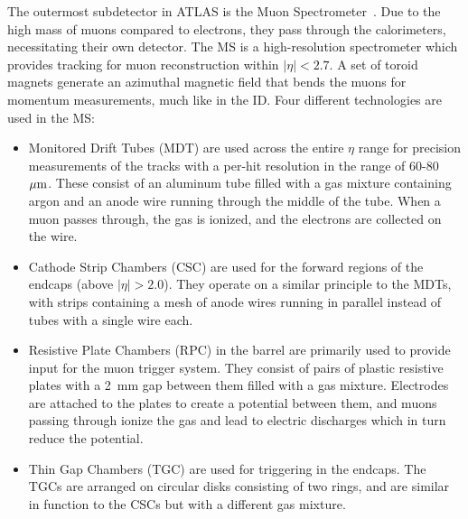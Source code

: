The outermost subdetector in ATLAS is the Muon Spectrometer~\cite{1997.ms-tdr}.
Due to the high mass of muons compared to electrons, they pass through the calorimeters, necessitating their own detector.
The MS is a high-resolution spectrometer which provides tracking for muon reconstruction within $|\eta| < 2.7$.
A set of toroid magnets generate an azimuthal magnetic field that bends the muons for momentum measurements, much like in the ID.
Four different technologies are used in the MS:
\begin{itemize}
\item Monitored Drift Tubes (MDT) are used across the entire $\eta$ range for precision measurements of the tracks with a per-hit resolution in the range of 60-80~$\mu\textrm{m}$.
These consist of an aluminum tube filled with a gas mixture containing argon and an anode wire running through the middle of the tube.
When a muon passes through, the gas is ionized, and the electrons are collected on the wire.
\item Cathode Strip Chambers (CSC) are used for the forward regions of the endcaps (above $|\eta| > 2.0$).
They operate on a similar principle to the MDTs, with strips containing a mesh of anode wires running in parallel instead of tubes with a single wire each.
\item Resistive Plate Chambers (RPC) in the barrel are primarily used to provide input for the muon trigger system.
They consist of pairs of plastic resistive plates with a 2~mm gap between them filled with a gas mixture.
Electrodes are attached to the plates to create a potential between them, and muons passing through ionize the gas and lead to electric discharges which in turn reduce the potential.
\item Thin Gap Chambers (TGC) are used for triggering in the endcaps.
The TGCs are arranged on circular disks consisting of two rings, and are similar in function to the CSCs but with a different gas mixture.
\end{itemize}
